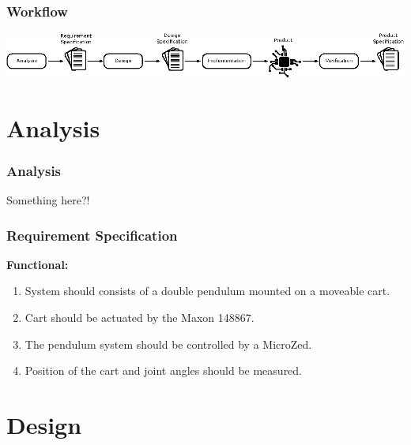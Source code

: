 \documentclass[mathserif]{beamer}
\begin{document}
\begin{frame}[c]\frametitle{Workflow}
\centering
\includegraphics[width=\textwidth]{graphics/workflow}    
\end{frame}


\section{Analysis}

\begin{frame}[t]\frametitle{Analysis}
    Something here?!
\end{frame}

\begin{frame}[c]\frametitle{Requirement Specification}

\textbf{Functional:}
\begin{enumerate}
	\item System should consists of a double pendulum mounted on a moveable cart.
	\item Cart should be actuated by the Maxon 148867. 
	\item The pendulum system should be controlled by a MicroZed.
	\item \alert<2>{Position of the cart and joint angles should be measured.}
\end{enumerate}

\end{frame}

\section{Design}
\end{document}
